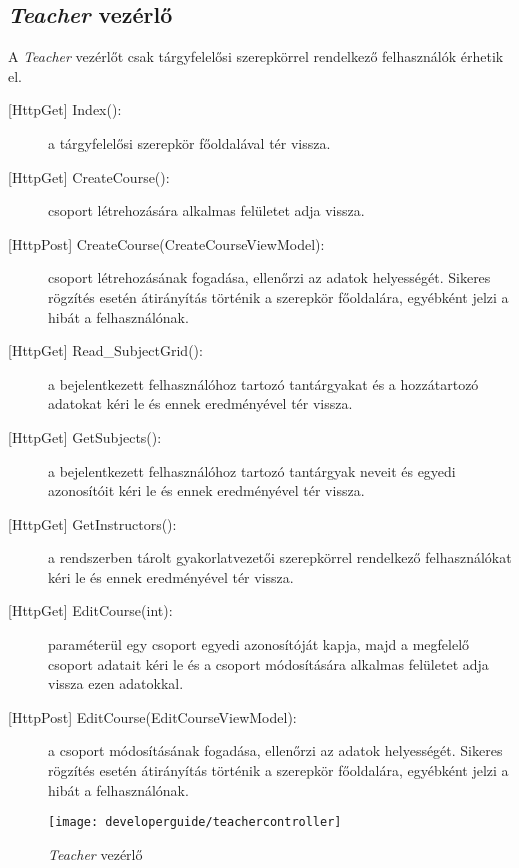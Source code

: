 \subsection{\emph{Teacher} vezérlő}
A \emph{Teacher} vezérlőt csak tárgyfelelősi szerepkörrel rendelkező felhasználók érhetik el.
\begin{description}
	\item[{[HttpGet]} Index():] a tárgyfelelősi szerepkör főoldalával tér vissza.
	\item[{[HttpGet]} CreateCourse():] csoport létrehozására alkalmas felületet adja vissza.
	\item[{[HttpPost]} CreateCourse(CreateCourseViewModel):] csoport létrehozásának fogadása, ellenőrzi az adatok helyességét. Sikeres rögzítés esetén átirányítás történik a szerepkör főoldalára, egyébként jelzi a hibát a felhasználónak.
	\item[{[HttpGet]} Read\_SubjectGrid():] a bejelentkezett felhasználóhoz tartozó tantárgyakat és a hozzátartozó adatokat kéri le és ennek eredményével tér vissza.
	\item[{[HttpGet]} GetSubjects():] a bejelentkezett felhasználóhoz tartozó tantárgyak neveit és egyedi azonosítóit kéri le és ennek eredményével tér vissza.
	\item[{[HttpGet]} GetInstructors():] a rendszerben tárolt gyakorlatvezetői szerepkörrel rendelkező felhasználókat kéri le és ennek eredményével tér vissza.
	\item[{[HttpGet]} EditCourse(int):] paraméterül egy csoport egyedi azonosítóját kapja, majd a megfelelő csoport adatait kéri le és a csoport módosítására alkalmas felületet adja vissza ezen adatokkal.
	\item[{[HttpPost]} EditCourse(EditCourseViewModel):] a csoport módosításának fogadása, ellenőrzi az adatok helyességét. Sikeres rögzítés esetén átirányítás történik a szerepkör főoldalára, egyébként jelzi a hibát a felhasználónak.
\end{description}
\begin{figure}[H]
	\centering
	\texttt{[image: developerguide/teachercontroller]}
	\caption{\emph{Teacher} vezérlő}
	\label{fig:teachercontroller}
\end{figure}
